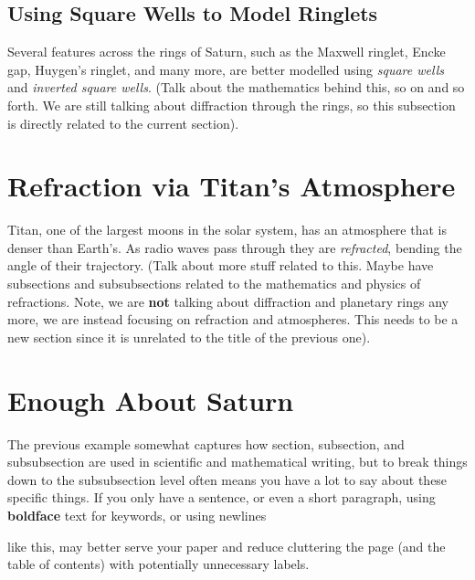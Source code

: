 \documentclass{article}
\theoremstyle{normal}
\begin{document}
        \subsection{Using Square Wells to Model Ringlets}
            Several features across the rings of Saturn, such as the
            Maxwell ringlet, Encke gap, Huygen's ringlet, and many more,
            are better modelled using \textit{square wells} and
            \textit{inverted square wells}. (Talk about the mathematics behind
            this, so on and so forth. We are still talking about diffraction
            through the rings, so this subsection is directly related to the
            current section).
    \section{Refraction via Titan's Atmosphere}
        Titan, one of the largest moons in the solar system, has an
        atmosphere that is denser than Earth's. As radio waves pass through
        they are \textit{refracted}, bending the angle of their trajectory.
        (Talk about more stuff related to this. Maybe have subsections and
        subsubsections related to the mathematics and physics of refractions.
        Note, we are \textbf{not} talking about diffraction and planetary
        rings any more, we are instead focusing on refraction and atmospheres.
        This needs to be a new section since it is unrelated to the title of
        the previous one).
    \section{Enough About Saturn}
        The previous example somewhat captures how section, subsection, and
        subsubsection are used in scientific and mathematical writing, but
        to break things down to the subsubsection level often means you have a
        lot to say about these specific things. If you only have a sentence,
        or even a short paragraph, using \textbf{boldface} text for keywords,
        or using newlines
        \par\hfill\par
        like this, may better serve your paper and reduce cluttering the page
        (and the table of contents) with potentially unnecessary labels.
\end{document}

